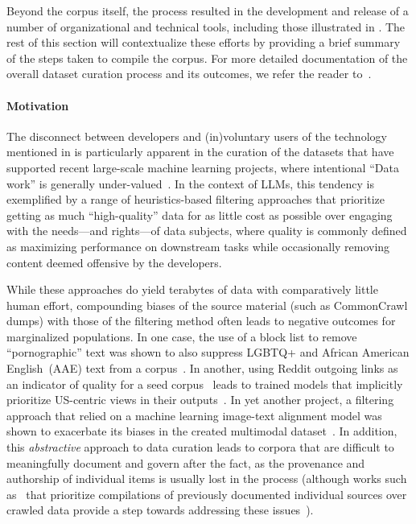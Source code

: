 \documentclass[twoside,11pt]{article}
\begin{document}
Beyond the corpus itself, the process resulted in the development and release of a number of organizational and technical tools, including those illustrated in .
The rest of this section will contextualize these efforts by providing a brief summary of the steps taken to compile the corpus. For more detailed documentation of the overall dataset curation process and its outcomes, we refer the reader to~\citet{laurencon2022bigscience}.

\paragraph{Motivation} The disconnect between developers and (in)voluntary users of the technology mentioned in  is particularly apparent in the curation of the datasets that have supported recent large-scale machine learning projects, where intentional ``Data work'' is generally under-valued~\citep{sambasivan2021cascades}. In the context of LLMs, this tendency is exemplified by a range of heuristics-based filtering approaches that prioritize getting as much ``high-quality'' data for as little cost as possible over engaging with the needs---and rights---of data subjects, where quality is commonly defined as maximizing performance on downstream tasks while occasionally removing content deemed offensive by the developers.

While these approaches do yield terabytes of data with comparatively little human effort, compounding biases of the source material (such as CommonCrawl dumps) with those of the filtering method often leads to negative outcomes for marginalized populations. In one case, the use of a block list to remove ``pornographic'' text was shown to also suppress LGBTQ+ and African American English~(AAE) text from a corpus~\citep{dodge2021documenting}. In another, using Reddit outgoing links as an indicator of quality for a seed corpus~\citep{radford2019language} leads to trained models that implicitly prioritize US-centric views in their outputs~\citep{johnson2022ghost}. In yet another project, a filtering approach that relied on a machine learning image-text alignment model was shown to exacerbate its biases in the created multimodal dataset~\citep{birhane2021multimodal}. In addition, this \textit{abstractive} approach to data curation leads to corpora that are difficult to meaningfully document and govern after the fact, as the provenance and authorship of individual items is usually lost in the process (although works such as~\citet{gao2020pile} that prioritize compilations of previously documented individual sources over crawled data provide a step towards addressing these issues~\citep{biderman2022datasheet}).
\end{document}
